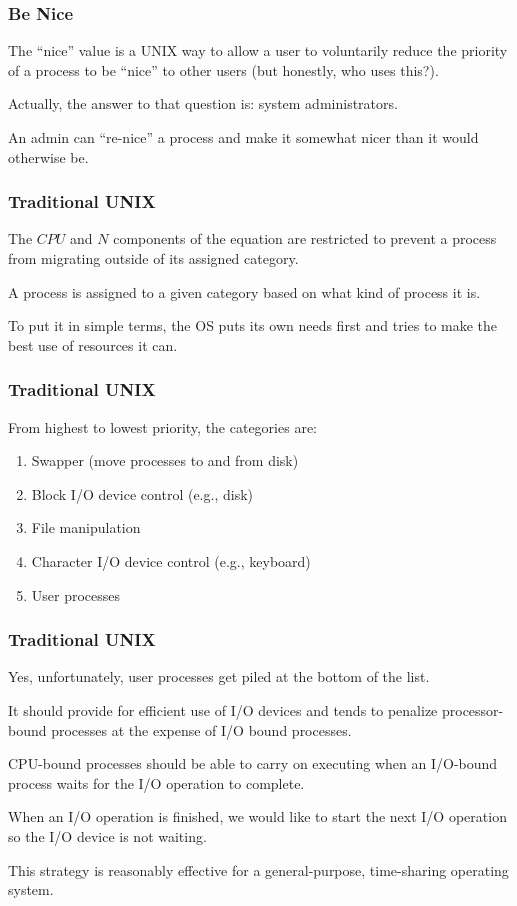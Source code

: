 \begin{frame}
\frametitle{Be Nice}

The ``nice'' value is a UNIX way to allow a user to voluntarily reduce the priority of a process to be ``nice'' to other users (but honestly, who uses this?).

Actually, the answer to that question is: system administrators. 

An admin can ``re-nice'' a process and make it somewhat nicer than it would otherwise be.


\end{frame}

\begin{frame}
\frametitle{Traditional UNIX}

The $CPU$ and $N$ components of the equation are restricted to prevent a process from migrating outside of its assigned category. 

A process is assigned to a given category based on what kind of process it is. 

To put it in simple terms, the OS puts its own needs first and tries to make the best use of resources it can.


\end{frame}

\begin{frame}
\frametitle{Traditional UNIX}

From highest to lowest priority, the categories are:

\begin{enumerate}
	\item Swapper (move processes to and from disk)
	\item Block I/O device control (e.g., disk)
	\item File manipulation
	\item Character I/O device control (e.g., keyboard)
	\item User processes
\end{enumerate}



\end{frame}

\begin{frame}
\frametitle{Traditional UNIX}

Yes, unfortunately, user processes get piled at the bottom of the list. 

It should provide for efficient use of I/O devices and tends to penalize processor-bound processes at the expense of I/O bound processes. 

CPU-bound processes should be able to carry on executing when an I/O-bound process waits for the I/O operation to complete. 

When an I/O operation is finished, we would like to start the next I/O operation so the I/O device is not waiting.

This strategy is reasonably effective for a general-purpose, time-sharing operating system.


\end{frame}

